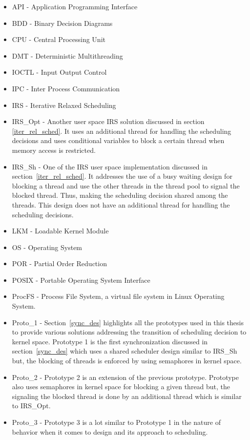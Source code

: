 \begin{itemize}

\item 	API 	-   Application Programming Interface
\item	BDD		-	Binary Decision Diagrams
\item	CPU		-	Central Processing Unit
\item	DMT		-	Deterministic Multithreading
\item	IOCTL	-	Input Output Control
\item	IPC		-	Inter Process Communication
\item	IRS		-	Iterative Relaxed Scheduling
\item  {IRS\_Opt} - Another user space IRS solution discussed in section~ \ref{iter_rel_sched}. 
It uses an additional thread for handling the scheduling decisions and uses conditional variables to block a certain thread when memory access is restricted. 
\item {IRS\_Sh} - One of the IRS user space implementation discussed in section~\ref{iter_rel_sched}. 
It addresses the use of a busy waiting design for blocking a thread and use the other threads in the thread pool to signal the blocked thread. 
Thus, making the scheduling decision shared among the threads. 
This design does not have an additional thread for handling the scheduling decisions. 
\item	LKM		-	Loadable Kernel Module
\item	OS		-	Operating System
\item	POR		- 	Partial Order Reduction
\item	POSIX	- 	Portable Operating System Interface
\item	ProcFS  -   Process File System, a virtual file system in Linux Operating System.
\item {Proto\_1} - Section~\ref{sync_des} highlights all the prototypes used in this thesis to provide various solutions addressing the transition of scheduling decision to kernel space. 
Prototype 1 is the first synchronization discussed in section~\ref{sync_des} which uses a shared scheduler design similar to IRS\_Sh but, the blocking of threads is enforced by using semaphores in kernel space. 
\item {Proto\_2} - Prototype 2 is an extension of the previous prototype. 
Prototype also uses semaphores in kernel space for blocking a given thread but, the signaling the blocked thread is done by an additional thread which is similar to IRS\_Opt.
\item {Proto\_3} - Prototype 3 is a lot similar to Prototype 1 in the nature of behavior when it comes to design and its approach to scheduling. 

\end{itemize}
